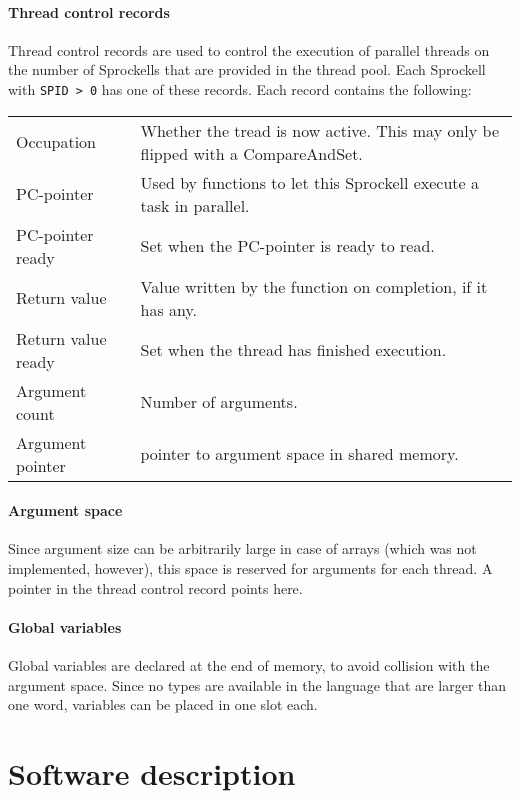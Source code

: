 \documentclass[10pt,a4paper]{report}
\begin{document}
\subsubsection{Thread control records}
Thread control records are used to control the execution of parallel threads on the number of Sprockells that are provided in the thread pool. Each Sprockell with \texttt{SPID > 0} has one of these records. Each record contains the following:

\begin{tabular}{| l | l |}
\hline
Occupation 
	& Whether the tread is now active. This may only be flipped with a CompareAndSet. \\
PC-pointer 
	& Used by functions to let this Sprockell execute a task in parallel. \\
PC-pointer ready 
	& Set when the PC-pointer is ready to read. \\
Return value 
	& Value written by the function on completion, if it has any. \\
Return value ready 
	& Set when the thread has finished execution. \\
Argument count 
	& Number of arguments. \\
Argument pointer 
	& pointer to argument space in shared memory. \\ 
\hline
\end{tabular}

\subsubsection{Argument space}
Since argument size can be arbitrarily large in case of arrays (which was not implemented, however), this space is reserved for arguments for each thread. A pointer in the thread control record points here.
       
\subsubsection{Global variables}
Global variables are declared at the end of memory, to avoid collision with the argument space. Since no types are available in the language that are larger than one word, variables can be placed in one slot each.


\chapter{Software description}
\end{document}
